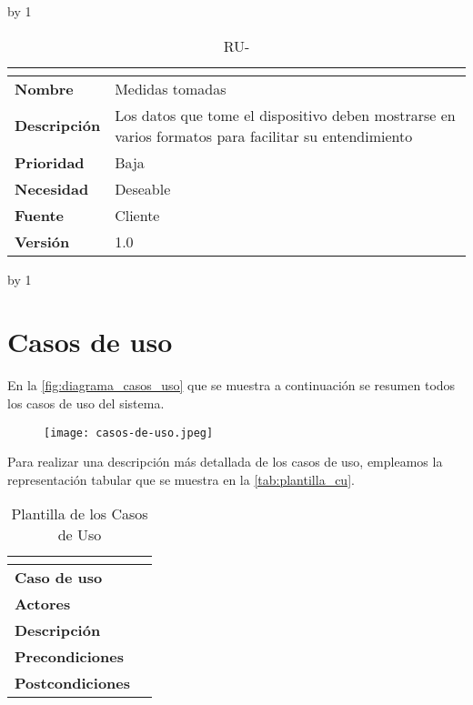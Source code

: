 \advance\ru by 1
\begin{table}[H]
	\caption{RU-\number\ru}
	\begin{tabular}{|l|p{}|}
		\hline
		\multicolumn{2}{|c|}{\cellcolor[HTML]{BFBFBF}{\color[HTML]{000000} \textbf{RU-\number\ru}}} \\ \hline
		\textbf{Nombre}      & Medidas tomadas                                                                                      \\ \hline
		\textbf{Descripción} & Los datos que tome el dispositivo deben mostrarse en varios formatos para facilitar su entendimiento \\ \hline
		\textbf{Prioridad}   & Baja                                                                                                 \\ \hline
		\textbf{Necesidad}   & Deseable                                                                                             \\ \hline
		\textbf{Fuente}      & Cliente                                                                                              \\ \hline
		\textbf{Versión}     & 1.0                                                                                                  \\ \hline
	\end{tabular}
\end{table}
\advance\ru by 1
\pagebreak

\section{Casos de uso}
En la \autoref{fig:diagrama_casos_uso} que se muestra a continuación se resumen todos los casos de uso del sistema.

\begin{figure}[H]
	{\texttt{[image: casos-de-uso.jpeg]}}
\end{figure}

Para realizar una descripción más detallada de los casos de uso, empleamos la representación tabular que se muestra en la \autoref{tab:plantilla_cu}.
\begin{table}[H]
	\centering
	\caption{Plantilla de los Casos de Uso}
	\label{tab:plantilla_cu}
	\begin{tabular}{|l|p{}|}
		\hline
		\multicolumn{2}{|c|}{\cellcolor[HTML]{BFBFBF}{\color[HTML]{000000} \textbf{CU-XX}}} \\ \hline
		\textbf{Caso de uso}     &   \\ \hline
		\textbf{Actores}         &   \\ \hline
		\textbf{Descripción}     &   \\ \hline
		\textbf{Precondiciones}  &   \\ \hline
		\textbf{Postcondiciones} &   \\ \hline
	\end{tabular}
\end{table}


